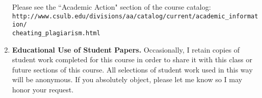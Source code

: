 \documentclass[9pt]{article}
\begin{document}
\begin{enumerate}
         Please see the ``Academic
         Action" section of the course catalog: \\
         \verb|http://www.csulb.edu/divisions/aa/catalog/current/academic_information/|\\
         \verb|cheating_plagiarism.html|
   \item \textbf{Educational Use of Student Papers.} Occasionally, I retain copies
   of student work completed for this course in order to share it with this class
   or future sections of this course. All selections of student work used in this
   way will be anonymous. If you absolutely object, please let me know so I may
   honor your request.
         
\end{enumerate}
\end{document}
